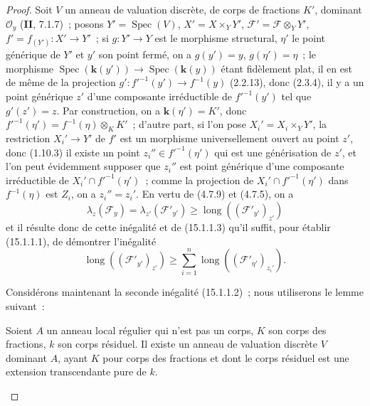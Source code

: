 \begin{proof}
Soit $V$ un anneau de valuation discrète, de corps de fractions $K'$, dominant
$\mathcal O_y$ (\textbf{II}, 7.1.7)~; posons $Y'=\operatorname{Spec}(V)$,
$X'=X\times_Y Y'$, $\mathcal F'=\mathcal F\otimes_Y Y'$,
$f'=f_{(Y')}:X'\to Y'$~; si $g:Y'\to Y$ est le morphisme structural, $\eta'$ le
point générique de $Y'$ et $y'$ son point fermé, on a $g(y')=y$, $g(\eta')=\eta$~;
le morphisme $\operatorname{Spec}(\boldsymbol{k}(y'))\to
\operatorname{Spec}(\boldsymbol{k}(y))$ étant fidèlement plat, il en est de même de
la projection $g':f'^{-1}(y')\to f^{-1}(y)$ (2.2.13), donc (2.3.4), il y a un
point générique $z'$ d'une composante irréductible de $f'^{-1}(y')$ tel que
$g'(z')=z$. Par construction, on a $\boldsymbol{k}(\eta')=K'$, donc
$f'^{-1}(\eta')=f^{-1}(\eta)\otimes_K K'$~; d'autre part, si l'on pose
$X_i'=X_i\times_Y Y'$, la restriction $X_i'\to Y'$ de $f'$ est un morphisme
universellement ouvert au point $z'$, donc (1.10.3) il existe un point
$z_i''\in f'^{-1}(\eta')$ qui est une générisation de $z'$, et l'on peut
évidemment supposer que $z_i''$ est point générique d'une composante
irréductible de $X_i'\cap f'^{-1}(\eta')$~; comme la projection de
$X_i'\cap f'^{-1}(\eta')$ dans $f^{-1}(\eta)$ est $Z_i$, on a $z_i''=z_i'$.
En vertu de (4.7.9) et (4.7.5), on a
\[
\tag{15.1.1.4}
\label{IV.15.1.1.4-fr}
  \lambda_z(\mathcal F_y)=\lambda_{z'}(\mathcal F'_{y'})
  \geqslant\operatorname{long}((\mathcal F'_{y'})_{z'})
\]
et il résulte donc de cette inégalité et de (15.1.1.3) qu'il suffit, pour établir
(15.1.1.1), de démontrer l'inégalité
\[
\tag{15.1.1.5}
\label{IV.15.1.1.5-fr}
  \operatorname{long}((\mathcal F'_{y'})_{z'})\geqslant
  \sum_{i=1}^{n}\operatorname{long}((\mathcal F'_{\eta'})_{z_i'}).
\]

Considérons maintenant la seconde inégalité (15.1.1.2)~; nous utiliserons le
lemme suivant~:

\begin{lemma}[15.1.1.6]
\label{IV.15.1.1.6-fr}
Soient $A$ un anneau local régulier qui n'est pas un corps, $K$ son corps des
fractions, $k$ son corps résiduel. Il existe un anneau de valuation discrète $V$
dominant $A$, ayant $K$ pour corps des fractions et dont le corps résiduel est
une extension transcendante pure de $k$.
\end{lemma}


\end{proof}
